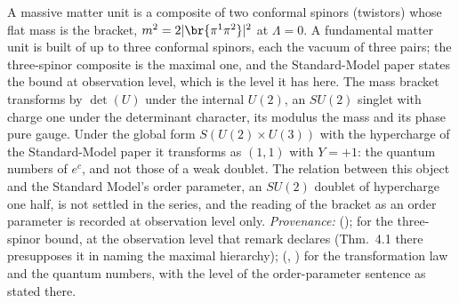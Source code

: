 A massive matter unit is a composite of two conformal spinors (twistors) whose flat mass is the bracket, $m^{2} = 2|\br{\pi^{1}\pi^{2}}|^{2}$ at $\Lambda = 0$. A fundamental matter unit is built of up to three conformal spinors, each the vacuum of three pairs; the three-spinor composite is the maximal one, and the Standard-Model paper states the bound at observation level, which is the level it has here. The mass bracket transforms by $\det(U)$ under the internal $U(2)$, an $SU(2)$ singlet with charge one under the determinant character, its modulus the mass and its phase pure gauge. Under the global form $S(U(2) \times U(3))$ with the hypercharge of the Standard-Model paper it transforms as $(1,1)$ with $Y = +1$: the quantum numbers of $e^{c}$, and not those of a weak doublet. The relation between this object and the Standard Model's order parameter, an $SU(2)$ doublet of hypercharge one half, is not settled in the series, and the reading of the bracket as an order parameter is recorded at observation level only. \emph{Provenance:} \cite[Prop.~4.1]{ButlerT11} (); \cite[Rem.~3.3]{ButlerT12} for the three-spinor bound, at the observation level that remark declares (Thm.~4.1 there presupposes it in naming the maximal hierarchy); \cite[Props.~3.1-3.2]{ButlerT12} (, ) for the transformation law and the quantum numbers, with the level of the order-parameter sentence as stated there.
